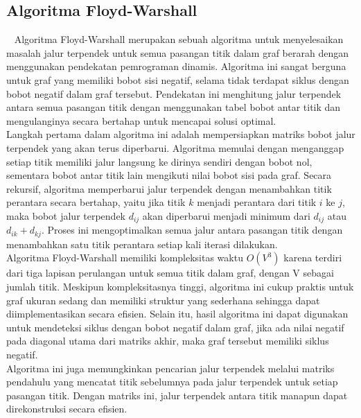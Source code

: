 \subsection{Algoritma Floyd-Warshall}
\label{floydwarshall}
~\cite{Cormen:09:intro}
Algoritma Floyd-Warshall merupakan sebuah algoritma untuk menyelesaikan masalah jalur terpendek untuk semua pasangan titik dalam graf berarah dengan menggunakan pendekatan pemrograman dinamis. Algoritma ini sangat berguna untuk graf yang memiliki bobot sisi negatif, selama tidak terdapat siklus dengan bobot negatif dalam graf tersebut. Pendekatan ini menghitung jalur terpendek antara semua pasangan titik dengan menggunakan tabel bobot antar titik dan mengulanginya secara bertahap untuk mencapai solusi optimal.
\\
Langkah pertama dalam algoritma ini adalah mempersiapkan matriks bobot jalur terpendek yang akan terus diperbarui. Algoritma memulai dengan menganggap setiap titik memiliki jalur langsung ke dirinya sendiri dengan bobot nol, sementara bobot antar titik lain mengikuti nilai bobot sisi pada graf. Secara rekursif, algoritma memperbarui jalur terpendek dengan menambahkan titik perantara secara bertahap, yaitu jika titik $k$ menjadi perantara dari titik $i$ ke $j$, maka bobot jalur terpendek $d_{ij}$ akan diperbarui menjadi minimum dari $d_{ij}$ atau $d_{ik} + d_{kj}$. Proses ini mengoptimalkan semua jalur antara pasangan titik dengan menambahkan satu titik perantara setiap kali iterasi dilakukan.
\\
Algoritma Floyd-Warshall memiliki kompleksitas waktu $O(V^3)$ karena terdiri dari tiga lapisan perulangan untuk semua titik dalam graf, dengan V sebagai jumlah titik. Meskipun kompleksitasnya tinggi, algoritma ini cukup praktis untuk graf ukuran sedang dan memiliki struktur yang sederhana sehingga dapat diimplementasikan secara efisien. Selain itu, hasil algoritma ini dapat digunakan untuk mendeteksi siklus dengan bobot negatif dalam graf, jika ada nilai negatif pada diagonal utama dari matriks akhir, maka graf tersebut memiliki siklus negatif.
\\
Algoritma ini juga memungkinkan pencarian jalur terpendek melalui matriks pendahulu yang mencatat titik sebelumnya pada jalur terpendek untuk setiap pasangan titik. Dengan matriks ini, jalur terpendek antara titik manapun dapat direkonstruksi secara efisien.

